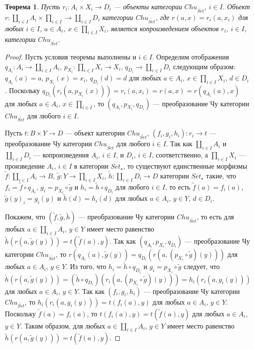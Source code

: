 \documentclass[a4paper,12pt]{article}
\newtheorem{theorem}{Теорема}
\begin{document}
\begin{theorem}\label{coproduct}
    Пусть $r_i: A_i \times X_i \to D_i$ --- объекты категории $Chu_{\widetilde{Set}}$, $i \in I$. Объект $r: \coprod_{i \in I} A_i \times \prod_{i \in I} \to \coprod_{i \in I} D_i$ категории $Chu_{\widetilde{Set}}$, где $r(a,x) = r_i(a, x_i)$ для любых $i \in I$, $a \in A_i$, $x \in \prod_{i \in I} X_i$, является копроизведением объектов $r_i$, $i \in I$, категории $Chu_{\widetilde{Set}}$.
\end{theorem}
\begin{proof}
    Пусть условия теоремы выполнены и $i \in I$. Определим отображения $q_{A_i}: A_i \to \coprod_{i \in I} A_i$, $p_{X_i}: \prod_{i \in I} X_i \to X_i$, $q_{D_i} \to \coprod_{i \in I} D_i$ следующим образом: $q_{A_i}(a) = a$, $p_{X_i}(x) = x_i$, $q_{D_i}(d) = d$ для любых $a \in A_i$, $x \in \prod_{i \in I} X_i$, $d \in D_i$. Поскольку $q_{D_i}(r_i(a,p_{X_i}(x))) = r_i(a,x_i) = r(a,x) = r(q_{A_i}(a),x)$ для любых $a \in A_i$, $x \in \prod_{i \in I}$, то $(q_{A_i}, p_{X_i}, q_{D_i})$ --- преобразование Чу категории $Chu_{\widetilde{Set}}$ для любого $i \in I$.

    Пусть $t: B \times Y \to D$ --- объект категории $Chu_{\widetilde{Set}}$, $(f_i,g_i,h_i): r_i \to t$ --- преобразование Чу категории $Chu_{\widetilde{Set}}$ для любого $i \in I$. Так как $\coprod_{i \in I} A_i$ и $\coprod_{i \in I} D_i$ --- копроизведения $A_i$, $ i \in I$, и $D_i$, $i \in I$, соответственно, а $\prod_{i \in I} X_i$ --- произведение $A_i$, $i \in I$ в категории $Set_{\star}$, то существуют единственные морфизмы $\tilde{f}: \coprod_{i \in I} A_i \to B$, $\tilde{g}: Y \to \prod_{i \in I} X_i$, $\tilde{h}: \coprod_{i \in I} D_i \to D$ категории $Set_{\star}$ такие, что $f_i = \tilde{f} \circ q_{A_i}$, $g_i = p_{X_i} \circ \tilde{g}$ и $h_i = \tilde{h} \circ q_{D_i}$ для любого $i \in I$, то есть $\tilde{f}(a) = f_i(a)$, $\tilde{g}(y)_i = g_i(y)$ и $\tilde{h}(d) = h_i(d)$ для любых $a \in A_i$, $y \in Y$, $d \in D_i$.

    Покажем, что $(\tilde{f},\tilde{g},\tilde{h})$ --- преобразование Чу категории $Chu_{\widetilde{Set}}$, то есть для любых $a \in \coprod_{i \in I} A_i$, $y \in Y$ имеет место равенство $\tilde{h}(r(a,\tilde{g}(y))) = t(\tilde{f}(a),y)$. Так как $(q_{A_i},p_{X_i},q_{D_i})$ --- преобразование Чу категории $Chu_{\widetilde{Set}}$, то $r(q_{A_i}(a),\tilde{g}(y)) = q_{D_i}(r(a,(p_{X_i} \circ \tilde{g})(y)))$ для любых $a \in A_i$, $y \in Y$. Из того, что $h_i = \tilde{h} \circ q_{D_i}$ и $g_i = p_{X_i} \circ \tilde{g}$ следует, что $\tilde{h}(r(a,\tilde{g}(y))) = (\tilde{h} \circ q_{D_i})(r_i(a,(p_{X_i} \circ \tilde{g})(y))) = h_i(r_i(a,g_i(y)))$ для любых $a \in A_i$, $y \in Y$. Так как $(f_i,g_i,h_i)$ --- преобразование Чу категории $Chu_{\widetilde{Set}}$, то $h_i(r_i(a,g_i(y))) = t(f_i(a),y)$ для любых $a \in A_i$, $y \in Y$. Поскольку $\tilde{f}(a) = f_i(a)$, то $t(f_i(a),y) = t(\tilde{f}(a),y)$ для любых $a \in A_i$, $y \in Y$. Таким образом, для любых $a \in \coprod_{i \in I} A_i$, $y \in Y$ имеет место равенство $\tilde{h}(r(a,\tilde{g}(y))) = t(\tilde{f}(a),y)$.
\end{proof}
\end{document}

